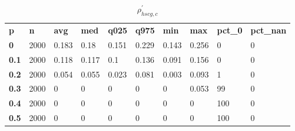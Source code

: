 \begin{table}[h]
 \centering 
\footnotesize
\caption{$\rho_{hscg,c}^\prime $}
\label{tab:alphahscgc}
\begin{tabular}[h]{| l l l l l l l l l l|
    } \hline
\textbf{ p} & \textbf{ n} & \textbf{ avg} & \textbf{ med} & \textbf{ q025} & \textbf{ q975} & \textbf{ min} & \textbf{ max} & \textbf{ pct\_0} & \textbf{ pct\_nan}
           \\
  \textbf{  0} & 2000 & 0.183 &  0.18 & 0.151 & 0.229 & 0.143 & 0.256 &   0 & 0
           \\
  \textbf{0.1} & 2000 & 0.118 & 0.117 &   0.1 & 0.136 & 0.091 & 0.156 &   0 & 0
           \\
  \textbf{0.2} & 2000 & 0.054 & 0.055 & 0.023 & 0.081 & 0.003 & 0.093 &   1 & 0
           \\
  \textbf{0.3} & 2000 &     0 &     0 &     0 &     0 &     0 & 0.053 &  99 & 0
           \\
  \textbf{0.4} & 2000 &     0 &     0 &     0 &     0 &     0 &     0 & 100 & 0
           \\
  \textbf{0.5} & 2000 &     0 &     0 &     0 &     0 &     0 &     0 & 100 & 0
           \\
 \hline \end{tabular}
 \end{table}
